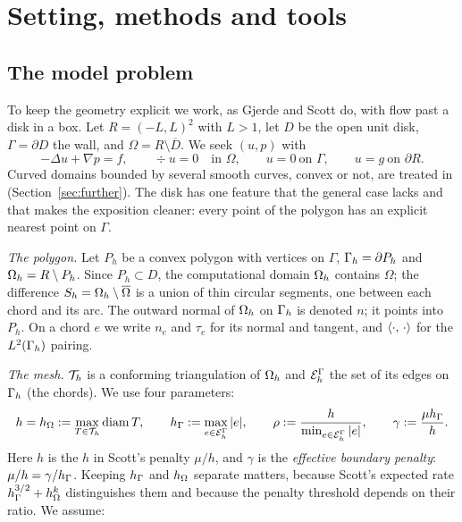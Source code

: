 \section{Setting, methods and tools}\label{sec:setting}

\subsection{The model problem}
To keep the geometry explicit we work, as Gjerde and Scott do, with flow past a disk in a box. Let $R=(-L,L)^2$ with $L>1$, let $D$ be the open unit disk, $\Gamma=\partial D$ the wall, and $\Omega=R\setminus\overline D$. We seek $(u,p)$ with
\[
-\Delta u+\nabla p=f,\qquad \div u=0\quad\text{in }\Omega,\qquad u=0\ \text{on }\Gamma,\qquad u=g\ \text{on }\partial R .
\]
Curved domains bounded by several smooth curves, convex or not, are treated in \cite{PadhiExt} (Section~\ref{sec:further}). The disk has one feature that the general case lacks and that makes the exposition cleaner: every point of the polygon has an explicit nearest point on $\Gamma$.

\emph{The polygon.} Let $P_h$ be a convex polygon with vertices on $\Gamma$, $\Gamma_h=\partial P_h$ and $\Omega_h=R\setminus P_h$. Since $P_h\subset D$, the computational domain $\Omega_h$ contains $\Omega$; the difference $S_h=\Omega_h\setminus\overline\Omega$ is a union of thin circular segments, one between each chord and its arc. The outward normal of $\Omega_h$ on $\Gamma_h$ is denoted $n$; it points into $P_h$. On a chord $e$ we write $n_e$ and $\tau_e$ for its normal and tangent, and $\langle \cdot,\, \cdot\rangle$ for the $L^2(\Gamma_h)$ pairing.

\emph{The mesh.} $\mathcal T_h$ is a conforming triangulation of $\Omega_h$ and $\mathcal E_h^\Gamma$ the set of its edges on $\Gamma_h$ (the chords). We use four parameters:
\[
h=h_\Omega:=\max_{T\in\mathcal T_h}\operatorname{diam} T,\qquad
h_\Gamma:=\max_{e\in\mathcal E_h^\Gamma}|e|,\qquad
\rho:=\frac{h}{\min_{e\in\mathcal E_h^\Gamma}|e|},\qquad
\gamma:=\frac{\mu h_\Gamma}{h}.
\]
Here $h$ is the $h$ in Scott's penalty $\mu/h$, and $\gamma$ is the \emph{effective boundary penalty}: $\mu/h=\gamma/h_\Gamma$. Keeping $h_\Gamma$ and $h_\Omega$ separate matters, because Scott's expected rate $h_\Gamma^{3/2}+h_\Omega^k$ distinguishes them and because the penalty threshold depends on their ratio. We assume:

